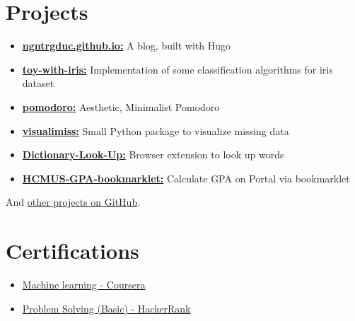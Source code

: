 \documentclass[letterpaper,11pt]{article}
\begin{document}
\section{Projects}
    \begin{itemize}
        \item \href{https://github.com/ngntrgduc/ngntrgduc.github.io}{\textbf{ngntrgduc.github.io:}} A blog, built with Hugo
        
        \item \href{https://github.com/ngntrgduc/toy-with-iris}{\textbf{toy-with-iris:}} Implementation of some classification algorithms for iris dataset
    
        \item \href{https://github.com/ngntrgduc/pomodoro}{\textbf{pomodoro:}} Aesthetic, Minimalist Pomodoro
    
        \item \href{https://github.com/ngntrgduc/visualimiss}{\textbf{visualimiss:}} Small Python package to visualize missing data 
        
        \item \href{https://github.com/ngntrgduc/Dictionary-Look-Up}{\textbf{Dictionary-Look-Up:}} Browser extension to look up words
        
        \item \href{https://github.com/ngntrgduc/HCMUS-GPA-bookmarklet}{\textbf{HCMUS-GPA-bookmarklet:}} Calculate GPA on Portal via bookmarklet
    \end{itemize}
    \vspace{-0.8em}
    And \href{https://github.com/ngntrgduc/projects}{other projects on GitHub}.


\section{Certifications}
    \begin{itemize}
        \item \href{https://coursera.org/share/c68e20d03f93ad3689a80fc68a52989c}{Machine learning - Coursera}
        
        \item \href{https://www.hackerrank.com/certificates/6286b603c4f7}{Problem Solving (Basic) - HackerRank}
    
    
    \end{itemize}
    
\end{document}
